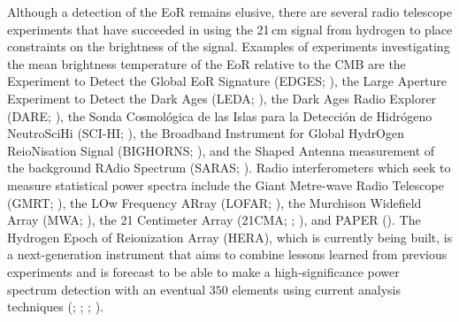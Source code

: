 \documentclass[preprint2,numberedappendix,tighten]{aastex6}  %
\begin{document}
Although a detection of the EoR remains elusive, there are several radio telescope experiments that have succeeded in using 
the 21\,cm signal from hydrogen to place constraints on the brightness of the signal. Examples of experiments investigating the 
mean brightness temperature of the EoR relative to the CMB are the Experiment to Detect the Global EoR Signature (EDGES; 
\citealt{bowman2010}), the Large Aperture Experiment to Detect the Dark Ages (LEDA; \citealt{bernardi_et_al2016}), the 
Dark Ages Radio Explorer (DARE; \citealt{burns2012}), the Sonda Cosmol\'ogica de las Islas para la Detecci\'on de 
Hidr\'ogeno NeutroSciHi (SCI-HI; \citealt{voytek2014}), the Broadband Instrument for Global HydrOgen ReioNisation Signal 
(BIGHORNS; \citealt{sokolowski2015}), and the Shaped Antenna measurement of the background RAdio Spectrum (SARAS; 
\citealt{patra2015}). Radio interferometers which seek to measure statistical power spectra include the Giant Metre-wave 
Radio Telescope (GMRT; \citealt{paciga_et_al2013}), the LOw Frequency ARray (LOFAR; \citealt{van_haarlem_et_al2013}), 
the Murchison Widefield Array (MWA; \citealt{tingay_et_al2013}), the 21 Centimeter Array (21CMA; 
\citealt{peterson_et_al2004}; \citealt{wu2009}), and PAPER (\citealt{parsons_et_al2010}). The Hydrogen Epoch of 
Reionization Array (HERA), which is currently being built, is a next-generation instrument that aims to combine lessons 
learned from previous experiments and is forecast to be able to make a high-significance power spectrum 
detection with an eventual $350$ elements using current analysis techniques (\citealt{pober_et_al2014}; \citealt{liu_parsons_2016}; \citealt{dillon_parsons2016}; \citealt{deboer_et_al2017}).
\end{document}
